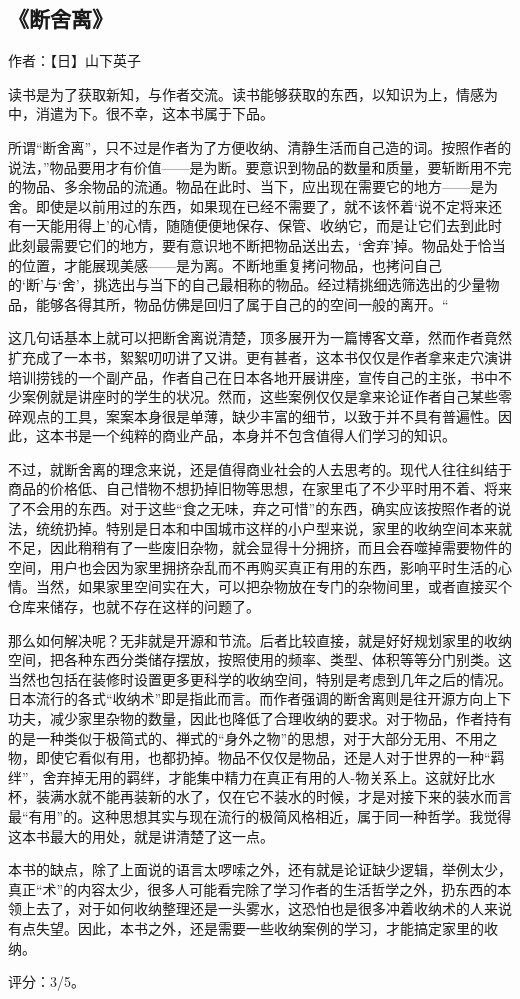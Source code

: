 \subsection{《断舍离》}

作者：【日】山下英子

读书是为了获取新知，与作者交流。读书能够获取的东西，以知识为上，情感为中，消遣为下。很不幸，这本书属于下品。

所谓“断舍离”，只不过是作者为了方便收纳、清静生活而自己造的词。按照作者的说法，”物品要用才有价值——是为断。要意识到物品的数量和质量，要斩断用不完的物品、多余物品的流通。物品在此时、当下，应出现在需要它的地方——是为舍。即使是以前用过的东西，如果现在已经不需要了，就不该怀着‘说不定将来还有一天能用得上’的心情，随随便便地保存、保管、收纳它，而是让它们去到此时此刻最需要它们的地方，要有意识地不断把物品送出去，‘舍弃’掉。物品处于恰当的位置，才能展现美感——是为离。不断地重复拷问物品，也拷问自己的‘断’与‘舍’，挑选出与当下的自己最相称的物品。经过精挑细选筛选出的少量物品，能够各得其所，物品仿佛是回归了属于自己的的空间一般的离开。“

这几句话基本上就可以把断舍离说清楚，顶多展开为一篇博客文章，然而作者竟然扩充成了一本书，絮絮叨叨讲了又讲。更有甚者，这本书仅仅是作者拿来走穴演讲培训捞钱的一个副产品，作者自己在日本各地开展讲座，宣传自己的主张，书中不少案例就是讲座时的学生的状况。然而，这些案例仅仅是拿来论证作者自己某些零碎观点的工具，案案本身很是单薄，缺少丰富的细节，以致于并不具有普遍性。因此，这本书是一个纯粹的商业产品，本身并不包含值得人们学习的知识。

不过，就断舍离的理念来说，还是值得商业社会的人去思考的。现代人往往纠结于商品的价格低、自己惜物不想扔掉旧物等思想，在家里屯了不少平时用不着、将来了不会用的东西。对于这些“食之无味，弃之可惜”的东西，确实应该按照作者的说法，统统扔掉。特别是日本和中国城市这样的小户型来说，家里的收纳空间本来就不足，因此稍稍有了一些废旧杂物，就会显得十分拥挤，而且会吞噬掉需要物件的空间，用户也会因为家里拥挤杂乱而不再购买真正有用的东西，影响平时生活的心情。当然，如果家里空间实在大，可以把杂物放在专门的杂物间里，或者直接买个仓库来储存，也就不存在这样的问题了。

那么如何解决呢？无非就是开源和节流。后者比较直接，就是好好规划家里的收纳空间，把各种东西分类储存摆放，按照使用的频率、类型、体积等等分门别类。这当然也包括在装修时设置更多更科学的收纳空间，特别是考虑到几年之后的情况。日本流行的各式“收纳术”即是指此而言。而作者强调的断舍离则是往开源方向上下功夫，减少家里杂物的数量，因此也降低了合理收纳的要求。对于物品，作者持有的是一种类似于极简式的、禅式的“身外之物”的思想，对于大部分无用、不用之物，即使它看似有用，也都扔掉。物品不仅仅是物品，还是人对于世界的一种“羁绊”，舍弃掉无用的羁绊，才能集中精力在真正有用的人-物关系上。这就好比水杯，装满水就不能再装新的水了，仅在它不装水的时候，才是对接下来的装水而言最“有用”的。这种思想其实与现在流行的极简风格相近，属于同一种哲学。我觉得这本书最大的用处，就是讲清楚了这一点。

本书的缺点，除了上面说的语言太啰嗦之外，还有就是论证缺少逻辑，举例太少，真正“术”的内容太少，很多人可能看完除了学习作者的生活哲学之外，扔东西的本领上去了，对于如何收纳整理还是一头雾水，这恐怕也是很多冲着收纳术的人来说有点失望。因此，本书之外，还是需要一些收纳案例的学习，才能搞定家里的收纳。

评分：3/5。